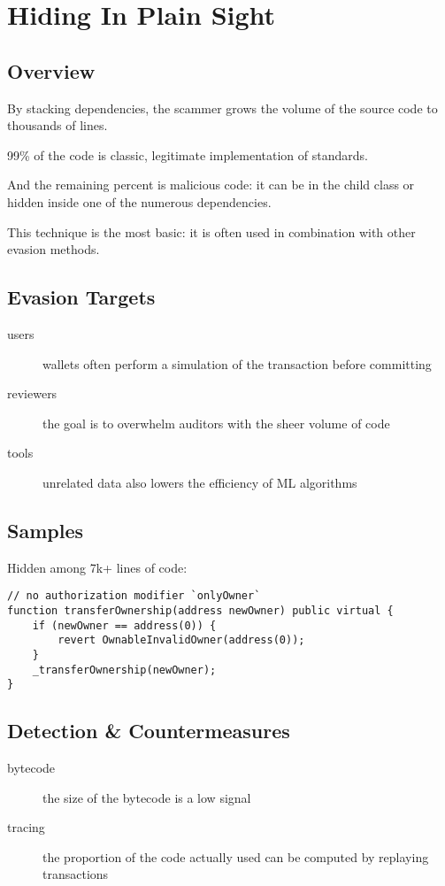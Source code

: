 \section{Hiding In Plain Sight} \label{sec:hiding-in-plain-sight}

\subsection{Overview}

By stacking dependencies, the scammer grows the volume of the source code to thousands of lines.

99\% of the code is classic, legitimate implementation of standards.

And the remaining percent is malicious code: it can be in the child class or hidden inside one of the numerous dependencies.

This technique is the most basic: it is often used in combination with other evasion methods.

\subsection{Evasion Targets}

\begin{description}
\item[users]{wallets often perform a simulation of the transaction before committing}
\item[reviewers]{the goal is to overwhelm auditors with the sheer volume of code}
\item[tools]{unrelated data also lowers the efficiency of ML algorithms}
\end{description}

\subsection{Samples}

Hidden among 7k+ lines of code:

\begin{lstlisting}[language=Solidity]
// no authorization modifier `onlyOwner`
function transferOwnership(address newOwner) public virtual {
    if (newOwner == address(0)) {
        revert OwnableInvalidOwner(address(0));
    }
    _transferOwnership(newOwner);
}
\end{lstlisting}

\subsection{Detection \& Countermeasures}

\begin{description}
\item[bytecode]{the size of the bytecode is a low signal}
\item[tracing]{the proportion of the code actually used can be computed by replaying transactions}
\end{description}

